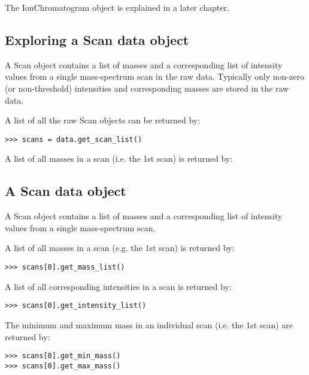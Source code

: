 \noindent
The IonChromatogram object is explained in a later chapter.

\subsection{Exploring a Scan data object}

A Scan object contains a list of masses and a corresponding list of intensity
values from a single mass-spectrum scan in the raw data. Typically only
non-zero (or non-threshold) intensities and corresponding masses are stored in
the raw data.


A list of all the raw Scan objects can be returned by:

\begin{verbatim}
>>> scans = data.get_scan_list()
\end{verbatim}

A list of all masses in a scan (i.e. the 1st scan) is returned by:

\subsection{A Scan data object}


A Scan object contains a list of masses and a corresponding list of intensity
values from a single mass-spectrum scan.

A list of all masses in a scan (e.g. the 1st scan) is returned by:

\begin{verbatim}
>>> scans[0].get_mass_list()
\end{verbatim}

A list of all corresponding intensities in a scan is returned by:

\begin{verbatim}
>>> scans[0].get_intensity_list()
\end{verbatim}

The minimum and maximum mass in an individual scan (i.e. the 1st scan) are
returned by:

\begin{verbatim}
>>> scans[0].get_min_mass()
>>> scans[0].get_max_mass()
\end{verbatim}

